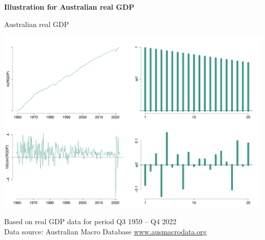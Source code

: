 \documentclass[notes,blackandwhite,mathsans]{beamer}
\begin{document}
{
\begin{frame}

\begin{adjustwidth}{-0.5cm}{0cm}
\vspace{8.3cm}\Large
\textbf{{\color{mcxs2}Illustration for} {\color{mcxs2}Australian real GDP}}
\end{adjustwidth}

\end{frame}
}





{
\begin{frame}{Australian real GDP}

\centering
\includegraphics[scale=0.28]{grphs/05rgdp.pdf}

\bigskip\footnotesize{\color{mcxs2}Based on real GDP data for period Q3 1959 -- Q4 2022\\
Data source: Australian Macro Database \href{http://www.ausmacrodata.org/}{www.ausmacrodata.org}}
\end{frame}
}
\end{document}
